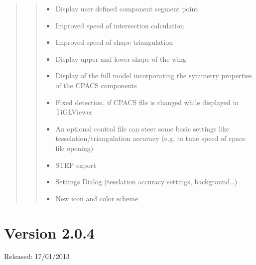 \documentclass[]{scrartcl}
\begin{document}
\begin{quote}
\begin{itemize}
  \begin{quote}
  \begin{itemize}
  \itemsep1pt\parskip0pt
  \item
    Display user defined component segment point
  \item
    Improved speed of intersection calculation
  \item
    Improved speed of shape triangulation
  \item
    Display upper and lower shape of the wing
  \item
    Display of the full model incorporating the symmetry properties of
    the CPACS components
  \item
    Fixed detection, if CPACS file is changed while displayed in
    TiGLViewer
  \item
    An optional control file can steer some basic settings like
    tesselation/triangulation accuracy (e.g. to tune speed of cpacs file
    opening)
  \item
    STEP export
  \item
    Settings Dialog (tesslation accuracy settings, background\ldots{})
  \item
    New icon and color scheme
  \end{itemize}
  \end{quote}
\end{itemize}
\end{quote}

\section{Version 2.0.4}

Released: 17/01/2013
\end{document}
